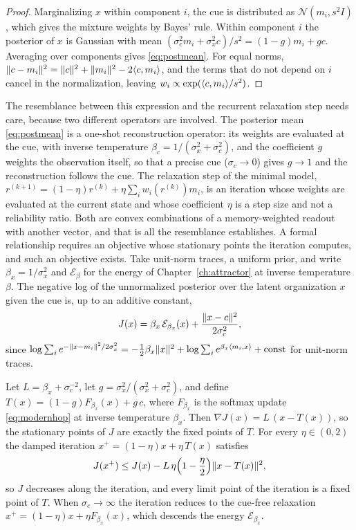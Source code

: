 \begin{proof}
Marginalizing $x$ within component $i$, the cue is distributed as $\mathcal N(m_i,s^2I)$, which gives the mixture weights by Bayes' rule. Within component $i$ the posterior of $x$ is Gaussian with mean $(\sigma_c^2m_i+\sigma_x^2c)/s^2=(1-g)m_i+gc$. Averaging over components gives \eqref{eq:postmean}. For equal norms, $\lVert c-m_i\rVert^2=\lVert c\rVert^2+\lVert m_i\rVert^2-2\langle c,m_i\rangle$, and the terms that do not depend on $i$ cancel in the normalization, leaving $w_i\propto\exp(\langle c,m_i\rangle/s^2)$.
\end{proof}

The resemblance between this expression and the recurrent relaxation step needs care, because two different operators are involved. The posterior mean \eqref{eq:postmean} is a one-shot reconstruction operator: its weights are evaluated at the cue, with inverse temperature $\beta_c=1/(\sigma_x^2+\sigma_c^2)$, and the coefficient $g$ weights the observation itself, so that a precise cue ($\sigma_c\to0$) gives $g\to1$ and the reconstruction follows the cue. The relaxation step of the minimal model, $r^{(k+1)}=(1-\eta)r^{(k)}+\eta\sum_iw_i(r^{(k)})m_i$, is an iteration whose weights are evaluated at the current state and whose coefficient $\eta$ is a step size and not a reliability ratio. Both are convex combinations of a memory-weighted readout with another vector, and that is all the resemblance establishes. A formal relationship requires an objective whose stationary points the iteration computes, and such an objective exists. Take unit-norm traces, a uniform prior, and write $\beta_x=1/\sigma_x^2$ and $\mathcal E_{\beta}$ for the energy of Chapter~\ref{ch:attractor} at inverse temperature $\beta$. The negative log of the unnormalized posterior over the latent organization $x$ given the cue is, up to an additive constant,
\begin{equation}\label{eq:Jobj}
J(x)=\beta_x\,\mathcal E_{\beta_x}(x)+\frac{\lVert x-c\rVert^2}{2\sigma_c^2},
\end{equation}
since $\log\sum_ie^{-\lVert x-m_i\rVert^2/2\sigma_x^2}=-\tfrac12\beta_x\lVert x\rVert^2+\log\sum_ie^{\beta_x\langle m_i,x\rangle}+\mathrm{const}$ for unit-norm traces.

\begin{proposition}\label{prop:map}
Let $L=\beta_x+\sigma_c^{-2}$, let $g=\sigma_x^2/(\sigma_x^2+\sigma_c^2)$, and define $T(x)=(1-g)F_{\beta_x}(x)+g\,c$, where $F_{\beta_x}$ is the softmax update \eqref{eq:modernhop} at inverse temperature $\beta_x$. Then $\nabla J(x)=L\,(x-T(x))$, so the stationary points of $J$ are exactly the fixed points of $T$. For every $\eta\in(0,2)$ the damped iteration $x^{+}=(1-\eta)x+\eta\,T(x)$ satisfies
\begin{equation}
J(x^{+})\le J(x)-L\,\eta\Bigl(1-\frac\eta2\Bigr)\lVert x-T(x)\rVert^2,
\end{equation}
so $J$ decreases along the iteration, and every limit point of the iteration is a fixed point of $T$. When $\sigma_c\to\infty$ the iteration reduces to the cue-free relaxation $x^+=(1-\eta)x+\eta F_{\beta_x}(x)$, which descends the energy $\mathcal E_{\beta_x}$.
\end{proposition}

